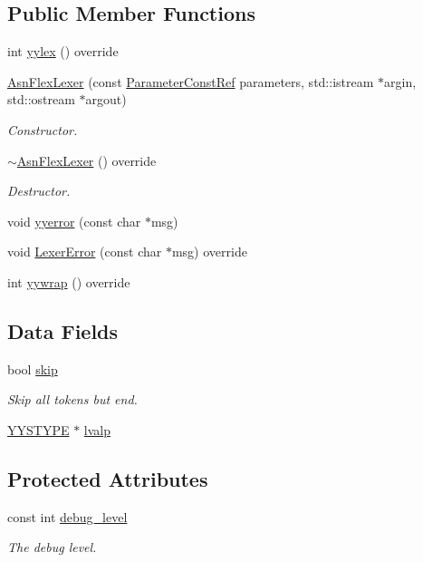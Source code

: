 \subsection*{Public Member Functions}
\begin{DoxyCompactItemize}
\item 
int \hyperlink{classAsnFlexLexer_a6d8a97df31d08813ceddfec7e841caab}{yylex} () override
\item 
\hyperlink{classAsnFlexLexer_aa1daf251342fdc1ed5b1b2fa6a40d486}{Asn\+Flex\+Lexer} (const \hyperlink{Parameter_8hpp_a37841774a6fcb479b597fdf8955eb4ea}{Parameter\+Const\+Ref} parameters, std\+::istream $\ast$argin, std\+::ostream $\ast$argout)
\begin{DoxyCompactList}\small\item\em Constructor. \end{DoxyCompactList}\item 
\hyperlink{classAsnFlexLexer_a6a77623de77e09c944c41852169cd306}{$\sim$\+Asn\+Flex\+Lexer} () override
\begin{DoxyCompactList}\small\item\em Destructor. \end{DoxyCompactList}\item 
void \hyperlink{classAsnFlexLexer_a0aedafd7d67e36bee5e6867f3950d8f6}{yyerror} (const char $\ast$msg)
\item 
void \hyperlink{classAsnFlexLexer_a1cc5845c6f3bd14294270362e4d21e56}{Lexer\+Error} (const char $\ast$msg) override
\item 
int \hyperlink{classAsnFlexLexer_afbd2259d58a1693fa2cfb13e6d9b6c3d}{yywrap} () override
\end{DoxyCompactItemize}
\subsection*{Data Fields}
\begin{DoxyCompactItemize}
\item 
bool \hyperlink{classAsnFlexLexer_a310fa2546b2c42caf74181410e14aef8}{skip}
\begin{DoxyCompactList}\small\item\em Skip all tokens but end. \end{DoxyCompactList}\item 
\hyperlink{asn__parser_8cpp_a2ceb5b985e149f18e018b142cfdd7264}{Y\+Y\+S\+T\+Y\+PE} $\ast$ \hyperlink{classAsnFlexLexer_a9d5000fe497b3c40a3c4744645202b4b}{lvalp}
\end{DoxyCompactItemize}
\subsection*{Protected Attributes}
\begin{DoxyCompactItemize}
\item 
const int \hyperlink{classAsnFlexLexer_a309e9724047263d552b4cd868c9c48b4}{debug\+\_\+level}
\begin{DoxyCompactList}\small\item\em The debug level. \end{DoxyCompactList}\end{DoxyCompactItemize}


